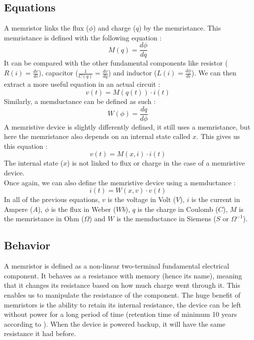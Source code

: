 \subsection{Equations}
A memristor links the flux ($\phi$) and charge ($q$) by the memristance.
This memristance is defined with the following equation :
\begin{equation}
  M(q)=\frac{d\phi}{dq}
\end{equation}
It can be compared with the other fundamental components like resistor ($R(i)=\frac{dv}{di}$), capacitor ($\frac{1}{C(q)}=\frac{dv}{dq}$) and inductor ($L(i)=\frac{d\phi}{di}$).
We can then extract a more useful equation in an actual circuit :
\begin{equation}
  v(t)=M(q(t))\cdot i(t)
\end{equation}
Similarly, a memductance can be defined as such :
\begin{equation}
  W(\phi)=\frac{dq}{d\phi}
\end{equation}
A memristive device is slightly differently defined, it still uses a memristance, but here the memristance also depends on an internal state called $x$. This gives us this equation :
\begin{equation}\label{eq:memristiveDev}
  v(t)=M(x,i)\cdot i(t)
\end{equation}
The internal state ($x$) is not linked to flux or charge in the case of a memristive device.\\
Once again, we can also define the memristive device using a memductance :
\begin{equation}
  i(t)=W(x,v)\cdot v(t)
\end{equation}
In all of the previous equations, $v$ is the voltage in Volt ($V$), $i$ is the current in Ampere ($A$), $\phi$ is the flux in Weber ($Wb$), $q$ is the charge in Coulomb ($C$), $M$ is the memristance in Ohm ($\Omega$) and $W$ is the memductance in Siemens ($S$ or $\Omega^{-1}$).

\subsection{Behavior}

A memristor is defined as a non-linear two-terminal fundamental electrical component. It behaves as a resistance with memory (hence its name), meaning that it changes its resistance based on how much charge went through it. This enables us to manipulate the resistance of the component.
The huge benefit of memristors is the ability to retain its internal resistance, the device can be left without power for a long period of time (retention time of minimum 10 years according to \cite{memRetention}). When the device is powered backup, it will have the same resistance it had before.

